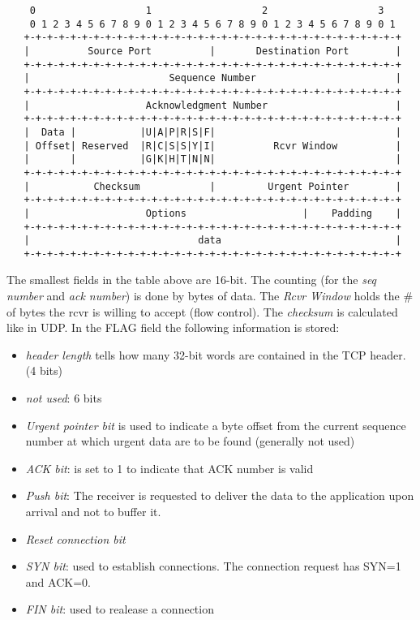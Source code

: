 \documentclass[10pt, a4paper, twocolumn]{scrartcl}
\begin{document}
\scriptsize
\begin{verbatim}
    0                   1                   2                   3   
    0 1 2 3 4 5 6 7 8 9 0 1 2 3 4 5 6 7 8 9 0 1 2 3 4 5 6 7 8 9 0 1 
   +-+-+-+-+-+-+-+-+-+-+-+-+-+-+-+-+-+-+-+-+-+-+-+-+-+-+-+-+-+-+-+-+
   |          Source Port          |       Destination Port        |
   +-+-+-+-+-+-+-+-+-+-+-+-+-+-+-+-+-+-+-+-+-+-+-+-+-+-+-+-+-+-+-+-+
   |                        Sequence Number                        |
   +-+-+-+-+-+-+-+-+-+-+-+-+-+-+-+-+-+-+-+-+-+-+-+-+-+-+-+-+-+-+-+-+
   |                    Acknowledgment Number                      |
   +-+-+-+-+-+-+-+-+-+-+-+-+-+-+-+-+-+-+-+-+-+-+-+-+-+-+-+-+-+-+-+-+
   |  Data |           |U|A|P|R|S|F|                               |
   | Offset| Reserved  |R|C|S|S|Y|I|          Rcvr Window          |
   |       |           |G|K|H|T|N|N|                               |
   +-+-+-+-+-+-+-+-+-+-+-+-+-+-+-+-+-+-+-+-+-+-+-+-+-+-+-+-+-+-+-+-+
   |           Checksum            |         Urgent Pointer        |
   +-+-+-+-+-+-+-+-+-+-+-+-+-+-+-+-+-+-+-+-+-+-+-+-+-+-+-+-+-+-+-+-+
   |                    Options                    |    Padding    |
   +-+-+-+-+-+-+-+-+-+-+-+-+-+-+-+-+-+-+-+-+-+-+-+-+-+-+-+-+-+-+-+-+
   |                             data                              |
   +-+-+-+-+-+-+-+-+-+-+-+-+-+-+-+-+-+-+-+-+-+-+-+-+-+-+-+-+-+-+-+-+
\end{verbatim}
\normalsize

The smallest fields in the table above are 16-bit. The counting (for the \textit{seq number} and \textit{ack number}) is done by bytes of data. The \textit{Rcvr Window} holds the \# of bytes the rcvr is willing to accept (flow control). The \textit{checksum} is calculated like in UDP. In the FLAG field the following information is stored:\\
\begin{itemize}
	\item \textit{header length} tells how many 32-bit words are contained in the TCP header. (4 bits)
	\item \textit{not used}: 6 bits
	\item \textit{Urgent pointer bit} is used to indicate a byte offset from the current sequence number at which urgent data are to be found (generally not used)
	\item \textit{ACK bit}: is set to 1 to indicate that ACK number is valid
	\item \textit{Push bit}: The receiver is requested to deliver the data to the application upon arrival and not to buffer it.
	\item \textit{Reset connection bit}
	\item \textit{SYN bit}: used to establish connections. The connection request has SYN=1 and ACK=0.
	\item \textit{FIN bit}: used to realease a connection
\end{itemize}
\end{document}
